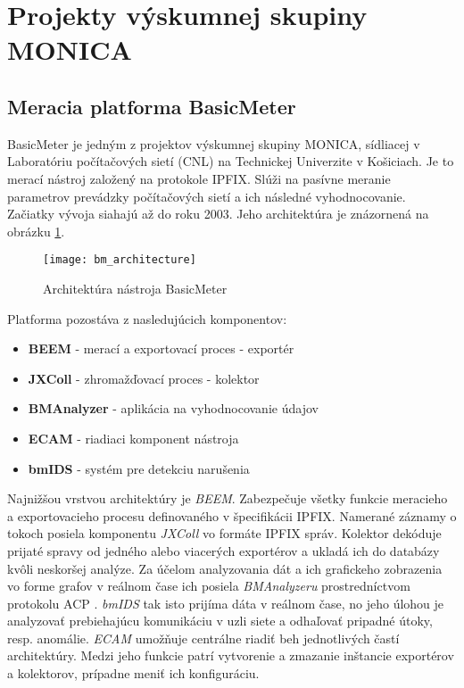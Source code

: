 \section{Projekty v\'yskumnej skupiny MONICA}

\subsection{Meracia platforma BasicMeter}

BasicMeter \citep{monica} je jedným z projektov výskumnej 
skupiny MONICA, sídliacej v Laboratóriu počítačových sietí (CNL) na Technickej Univerzite v Košiciach. 
Je to merací nástroj založený na protokole IPFIX. Slúži na pasívne meranie parametrov prevádzky 
počítačových sietí a ich následné vyhodnocovanie. Začiatky vývoja siahajú až do roku 2003. Jeho 
architektúra je znázornená na obrázku \ref{o:bm_architecture}.

\begin{figure}[ht!]
\centering
\texttt{[image: bm\_architecture]}
\caption{Architektúra nástroja BasicMeter \citep{ja}}\label{o:bm_architecture}
\end{figure}

Platforma pozostáva z nasledujúcich komponentov:
\begin{itemize}
 \item \textbf{BEEM} - merací a exportovací proces - exportér
 \item \textbf{JXColl} - zhromažďovací proces - kolektor
 \item \textbf{BMAnalyzer} - aplikácia na vyhodnocovanie údajov
 \item \textbf{ECAM} - riadiaci komponent nástroja
 \item \textbf{bmIDS} - systém pre detekciu narušenia
\end{itemize}

Najnižšou vrstvou architektúry je \emph{BEEM}. Zabezpečuje všetky funkcie 
meracieho a exportovacieho procesu definovaného v špecifikácii IPFIX. Namerané záznamy o tokoch
posiela komponentu \emph{JXColl} vo formáte IPFIX správ. Kolektor dekóduje prijaté spravy od jedného
alebo viacerých exportérov a ukladá ich do databázy kvôli neskoršej analýze. Za účelom analyzovania dát
a ich grafickeho zobrazenia vo forme grafov v reálnom čase ich posiela \emph{BMAnalyzeru} prostredníctvom 
protokolu ACP \citep{ado}. \emph{bmIDS} tak isto prijíma dáta v reálnom čase, no jeho úlohou je analyzovať
prebiehajúcu komunikáciu v uzli siete a odhaľovať pripadné útoky, resp. anomálie. \emph{ECAM} umožňuje 
centrálne riadiť beh jednotlivých častí architektúry. Medzi jeho funkcie patrí vytvorenie a zmazanie 
inštancie exportérov a kolektorov, prípadne meniť ich konfiguráciu. \citep{ja, veri}

